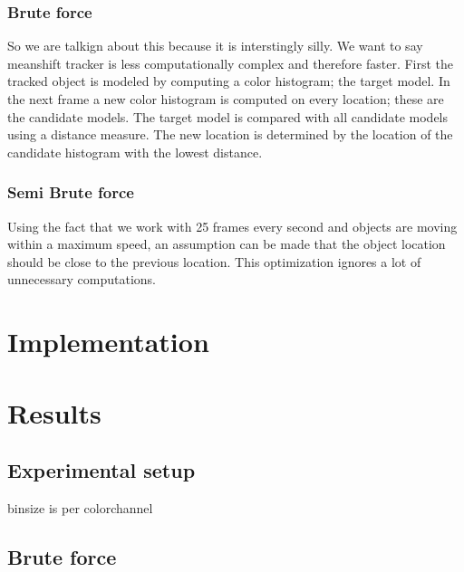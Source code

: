 \documentclass[a4paper,11pt]{article}
\begin{document}
\subsubsection{Brute force}
So we are talkign about this because it is interstingly silly. We want to say meanshift tracker is less computationally complex and therefore faster. 
First the tracked object is modeled by computing a color histogram; the target model. In the next frame a new color histogram is computed on every location; these are the candidate models. The target model is compared with all candidate models using a distance measure. The new location is determined by the location of the candidate histogram with the lowest distance.
		
\subsubsection{Semi Brute force}
Using the fact that we work with 25 frames every second and objects are moving within a maximum speed, an assumption can be made that the object location should be close to the previous location. This optimization ignores a lot of unnecessary computations.

	

	




\section{Implementation}

\section{Results} 
	\subsection{Experimental setup} 
	binsize is per colorchannel
	\subsection{Brute force} 
\end{document}
